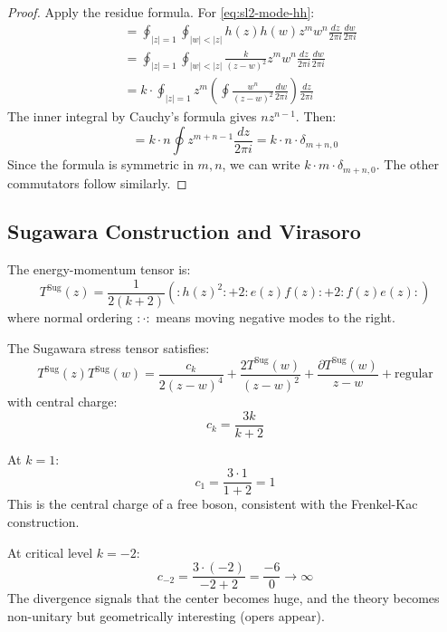 \begin{proof}
Apply the residue formula. For \eqref{eq:sl2-mode-hh}:
\begin{align*}
[h_m, h_n] &= \oint_{|z|=1} \oint_{|w|<|z|} h(z)h(w) z^m w^n \frac{dz}{2\pi i} \frac{dw}{2\pi i} \\
&= \oint_{|z|=1} \oint_{|w|<|z|} \frac{k}{(z-w)^2} z^m w^n \frac{dz}{2\pi i} \frac{dw}{2\pi i} \\
&= k \cdot \oint_{|z|=1} z^m \left(\oint \frac{w^n}{(z-w)^2} \frac{dw}{2\pi i}\right) \frac{dz}{2\pi i}
\end{align*}
The inner integral by Cauchy's formula gives $n z^{n-1}$. Then:
$$= k \cdot n \oint z^{m+n-1} \frac{dz}{2\pi i} = k \cdot n \cdot \delta_{m+n,0}$$
Since the formula is symmetric in $m,n$, we can write $k \cdot m \cdot \delta_{m+n,0}$. The other commutators follow similarly.
\end{proof}

\subsection{Sugawara Construction and Virasoro}

\begin{construction}
The energy-momentum tensor is:
$$T^{\text{Sug}}(z) = \frac{1}{2(k+2)}\left(: h(z)^2 : + 2 : e(z)f(z) : + 2 : f(z)e(z) :\right)$$
where normal ordering $: \cdot :$ means moving negative modes to the right.
\end{construction}

\begin{theorem}
The Sugawara stress tensor satisfies:
$$T^{\text{Sug}}(z)T^{\text{Sug}}(w) = \frac{c_k}{2(z-w)^4} + \frac{2T^{\text{Sug}}(w)}{(z-w)^2} + \frac{\partial T^{\text{Sug}}(w)}{z-w} + \text{regular}$$
with central charge:
$$c_k = \frac{3k}{k+2}$$
\end{theorem}

\begin{computation}
At $k=1$:
$$c_1 = \frac{3 \cdot 1}{1+2} = 1$$
This is the central charge of a free boson, consistent with the Frenkel-Kac construction.

At critical level $k=-2$:
$$c_{-2} = \frac{3 \cdot (-2)}{-2+2} = \frac{-6}{0} \to \infty$$
The divergence signals that the center becomes huge, and the theory becomes non-unitary but geometrically interesting (opers appear).
\end{computation}

